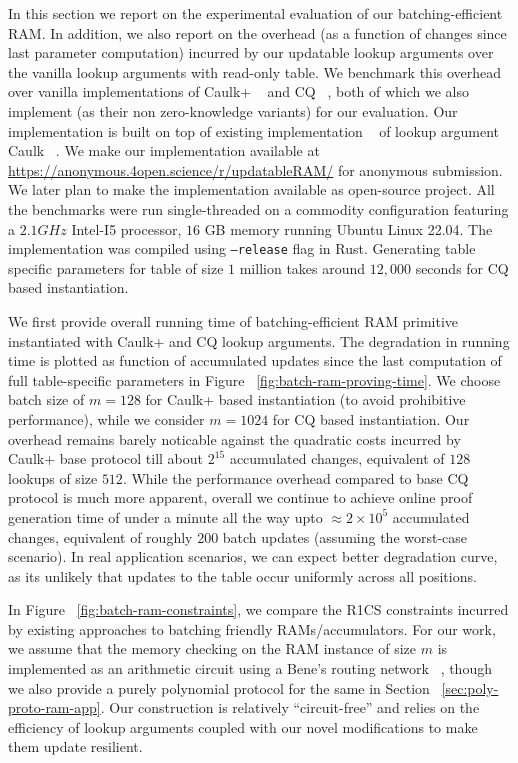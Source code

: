In this section we report on the experimental evaluation of our batching-efficient RAM.
In addition, we also report on the overhead (as a function of changes since last parameter computation)
incurred by our updatable lookup arguments over the vanilla lookup arguments with read-only table. We
benchmark this overhead over vanilla implementations of Caulk+ ~\cite{EPRINT:PosKat22} and
CQ ~\cite{EPRINT:EagFioGab22}, both of which we also implement (as their non zero-knowledge variants)
for our evaluation. Our implementation is built on top of existing implementation ~\cite{caulk-implementation}
of lookup argument Caulk ~\cite{CCS:ZBKMNS22}. We make our implementation available at
\url{https://anonymous.4open.science/r/updatableRAM/} for anonymous submission. We later plan to
make the implementation available as open-source project.
All the benchmarks were run single-threaded on a commodity configuration featuring a $2.1GHz$ Intel-I5 processor,
$16$ GB memory running Ubuntu Linux 22.04. The implementation was compiled using {\tt --release}
flag in Rust. Generating table specific parameters for table of size $1$ million takes around $12,000$
seconds for CQ based instantiation.

We first provide overall running time of batching-efficient RAM primitive instantiated with Caulk+
and CQ lookup arguments. The degradation in running time is plotted as function of accumulated updates
since the last computation of full table-specific parameters in Figure ~\ref{fig:batch-ram-proving-time}.
We choose batch size of $m=128$ for Caulk+ based instantiation (to avoid prohibitive performance),
while we consider $m=1024$ for CQ based instantiation. Our overhead remains barely noticable against
the quadratic costs incurred by Caulk+ base protocol till about $2^{15}$ accumulated changes, equivalent of
$128$ lookups of size $512$. While the performance overhead compared to base CQ protocol is much more apparent,
overall we continue to achieve online proof generation time of under a minute all the way upto
$\approx 2\times 10^5$ accumulated changes, equivalent of roughly $200$ batch updates (assuming the worst-case
scenario). In real application scenarios, we can expect better degradation curve, as its unlikely that updates
to the table occur uniformly across all positions.

In Figure ~\ref{fig:batch-ram-constraints}, we compare the
R1CS constraints incurred by existing approaches to batching friendly RAMs/accumulators. For our work, we assume
that the memory checking on the RAM instance of size $m$ is implemented as an arithmetic circuit using a Bene's
routing network ~\cite{benes}, though we also provide a purely polynomial protocol for the same in Section ~\ref{sec:poly-proto-ram-app}.
Our construction is relatively ``circuit-free'' and relies on the efficiency of lookup arguments coupled with
our novel modifications to make them update resilient.

